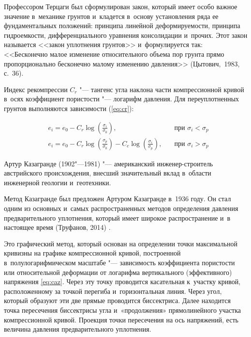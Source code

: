  Профессором Терцаги был сформулирован закон, который имеет особо важное значение в~механике грунтов и~кладется в~основу установления ряда ее фундаментальных положений: 
 принципа линейной деформируемости, 
 принципа гидроемкости, 
 дифференциального уравнения консолидации и~прочих.
 Этот закон называется <<закон уплотнения грунтов>> и~формулируется так: <<Бесконечно малое изменение относительного объема пор грунта прямо пропорционально бесконечно малому изменению давления>> (Цытович,~1983, с.~36)\cite[36]{cytovich1983}.

 Индекс рекомпрессии $C_r$ "--- тангенс угла наклона части компрессионной кривой в~осях коэффициент пористости "--- логарифм давления.
 Для переуплотненных грунтов выполняются зависимости (\ref{eq:cr}):

\begin{equation}
  \label{eq:cr}
  \begin{alignedat}{2}
  & e_i = e_0 - C_r\log \left(\frac{\sigma_i}{\sigma_0}\right), \quad &\text{при } \sigma_i<\sigma_p \\
  & e_i = e_0 - C_r\log \left(\frac{\sigma_p}{\sigma_0}\right) - C_c\log \left(\frac{\sigma_i}{\sigma_p}\right), \quad &\text{при } \sigma_i>\sigma_p
  \end{alignedat}
\end{equation}


 
 Артур Казагранде (1902"---1981) "--- американский инженер-строитель австрийского происхождения, внесший значительный вклад в~области инженерной геологии и~геотехники. 
 
 Метод Казагранде был предложен Артуром Казагранде в~1936 году.
 Он стал одним из основных и~самых распространенных методов определения давления предварительного уплотнения, который имеет широкое распространение и~в настоящее время (Труфанов, 2014) \cite{truf2014}.
 
    

 Это графический метод, который основан на определении точки максимальной кривизны на графике компрессионной кривой, построенной в~полулогарифмическом масштабе "--- зависимость коэффициента пористости или относительной деформации от логарифма вертикального (эффективного) напряжения \ref{eq:caz}. 
 Через эту точку проводится касательная к~участку кривой, расположенному за точкой перегиба и~горизонтальная линия. 
 Через угол, который образуют эти две прямые проводится биссектриса. 
 Далее находится точка пересечения биссектрисы угла и~«продолжения» прямолинейного участка компрессионной кривой. Проекция точки пересечения на ось напряжений, есть величина давления предварительного уплотнения. 

